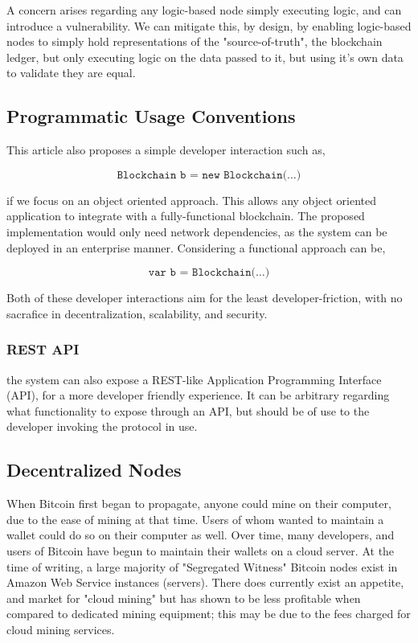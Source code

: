 \documentclass[12pt, titlepage, twocolumn]{report}
\begin{document}
A concern arises regarding any logic-based node simply executing logic, and can introduce a vulnerability. We can mitigate this, by design, by enabling logic-based nodes to simply hold representations of the "source-of-truth", the blockchain ledger, but only executing logic on the data passed to it, but using it's own data to validate they are equal.

\subsection{Programmatic Usage Conventions}
This article also proposes a simple developer interaction such as,

\begin{equation}
\texttt{Blockchain b = new Blockchain(\ldots)}
\end{equation}

if we focus on an object oriented approach. This allows any object oriented application to integrate with a fully-functional blockchain. The proposed implementation would only need network dependencies, as the system can be deployed in an enterprise manner. Considering a functional approach can be,

\begin{equation}
\texttt{var b = Blockchain(\ldots)}
\end{equation}

Both of these developer interactions aim for the least developer-friction, with no sacrafice in decentralization, scalability, and security.

\subsubsection{REST API}
the system can also expose a REST-like Application Programming Interface (API), for a more developer friendly experience. It can be arbitrary regarding what functionality to expose through an API, but should be of use to the developer invoking the protocol in use.

\subsection{Decentralized Nodes}
When Bitcoin first began to propagate, anyone could mine on their computer, due to the ease of mining at that time. Users of whom wanted to maintain a wallet could do so on their computer as well. Over time, many developers, and users of Bitcoin have begun to maintain their wallets on a cloud server. At the time of writing, a large majority of "Segregated Witness" Bitcoin nodes exist in Amazon Web Service instances (servers). There does currently exist an appetite, and market for "cloud mining" but has shown to be less profitable when compared to dedicated mining equipment; this may be due to the fees charged for cloud mining services.
\end{document}
